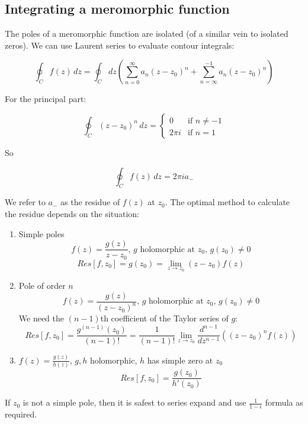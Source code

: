 \documentclass{physics_notes}
\begin{document}
\subsection{Integrating a meromorphic function }\label{sec:evaluating_poles}

The poles of a meromorphic function are isolated (of a similar vein to isolated zeros). We can use Laurent series to evaluate contour integrals:

\[ \oint_C f(z)\, dz = \oint_C dz \left(\sum_{n=0}^\infty a_n (z-z_0)^n + \sum_{n=\infty}^{-1} a_n (z-z_0)^n \right) \]

For the principal part:

\[ \oint_C (z-z_0)^n \, dz = \begin{cases} 0 & \mbox{if } n\neq -1 \\ 2\pi i & \mbox{if } n = 1 \end{cases}\]

So 

\begin{equation}
\oint_C f(z)\, dz = 2\pi i a_{-}
\end{equation} 

We refer to $a_{-}$ as the residue of $f(z)$ at $z_0$. The optimal method to calculate the residue depends on the situation:

\begin{enumerate}[label=\alph*)]
\item{Simple poles \[ f(z) = \frac{g(z)}{z - z_0} \text{, $g$ holomorphic at $z_0$, $g(z_0) \neq 0$}\] \[ Res[f, z_0] = g(z_0) = \lim_{z\to z_0} (z - z_0)f(z) \]}
\item{Pole of order $n$ \[ f(z) = \frac{g(z)}{(z - z_0)^n} \text{, $g$ holomorphic at $z_0$, $g(z_0) \neq 0$}\] We need the $(n-1)$th coefficient of the Taylor series of $g$: \[ Res[f, z_0] = \frac{g^{(n-1)} (z_0)}{(n-1)!} = \frac{1}{(n-1)!}\lim_{z\to z_0} \frac{d^{n-1}}{dz^{n-1}}\left( (z - z_0)^n f(z)\right) \]}
\item{$f(z) = \frac{g(z)}{h(z)}$, $g,h$ holomorphic, $h$ has simple zero at $z_0$ \[ Res[f, z_0] = \frac{g(z_0)}{h'(z_0)}\]}
\end{enumerate}

If $z_0$ is not a simple pole, then it is safest to series expand and use $\frac{1}{1-\epsilon}$ formula as required.
\end{document}

